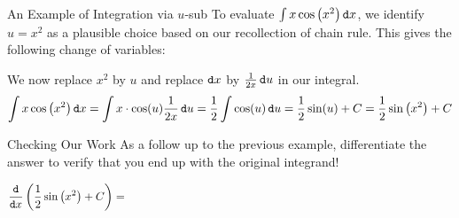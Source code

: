 \begin{example}{An Example of Integration via $u$-sub}\label{sup} To evaluate $ \int x \cos\left( x^2\right) \mathop{}\!\mathtt{d} x$, we identify $u=x^2$ as a plausible choice based on our recollection of chain rule.  This gives the following change of variables:

We now replace $x^2$ by $u$ and replace $\mathop{}\!\mathtt{d} x$ by $\frac{1}{2x}\mathop{}\!\mathtt{d} u$ in our integral.
$$ \int x \cos\left( x^2\right) \mathop{}\!\mathtt{d} x = \int x\cdot \cos(u) \frac{1}{2x}\mathop{}\!\mathtt{d} u =\frac{1}{2}\int \cos(u) \mathop{}\!\mathtt{d} u=\frac{1}{2}\sin(u)+C=\frac{1}{2}\sin\left(x^2\right)+C$$

\end{example}

\begin{exercise}{Checking Our Work \Coffeecup }
As a follow up to the previous example, differentiate the answer to verify that you end up with the original integrand!

$$\frac{\dif}{\dif x}\left(\frac{1}{2}\sin\left(x^2\right)+C\right)=\hspace{4in}$$

\end{exercise}

